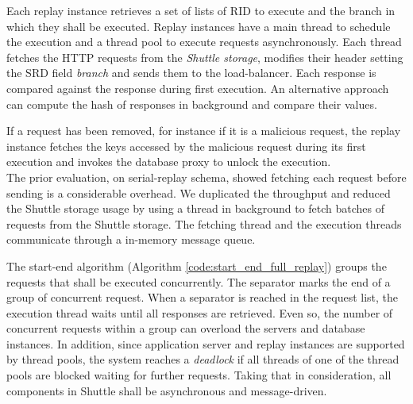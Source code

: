 Each replay instance retrieves a set of lists of \acf{RID} to execute and the branch in which they shall be executed. Replay instances have a main thread to schedule the execution and a thread pool to execute requests asynchronously. Each thread fetches the \acs{HTTP} requests from the \emph{Shuttle storage}, modifies their header setting the \ac{SRD} field \emph{branch} and sends them to the load-balancer. Each response is compared against the response during first execution. An alternative approach can compute the hash of responses in background and compare their values.

If a request has been removed, for instance if it is a malicious request, the replay instance fetches the keys accessed by the malicious request during its first execution and invokes the database proxy to unlock the execution.\\ %

The prior evaluation, on serial-replay schema, showed fetching each request before sending is a considerable overhead. We duplicated the throughput and reduced the Shuttle storage usage by using a thread in background to fetch batches of requests from the Shuttle storage. The fetching thread and the execution threads communicate through a in-memory message queue.

The start-end algorithm (Algorithm \ref{code:start_end_full_replay}) groups the requests that shall be executed concurrently. The separator marks the end of a group of concurrent request. When a separator is reached in the request list, the execution thread waits until all responses are retrieved. Even so, the number of concurrent requests within a group can overload the servers and database instances. In addition, since application server and replay instances are supported by thread pools, the system reaches a \emph{deadlock} if all threads of one of the thread pools are blocked waiting for further requests. Taking that in consideration, all components in Shuttle shall be asynchronous and message-driven.


